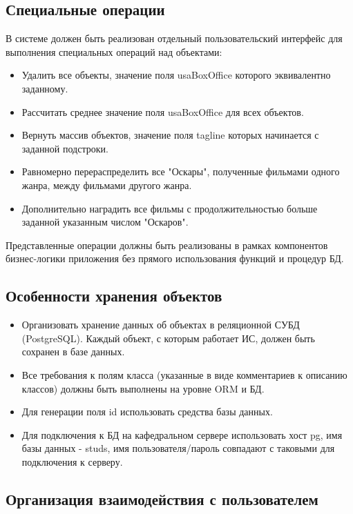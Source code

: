 \subsection{Специальные операции}

В системе должен быть реализован отдельный пользовательский интерфейс для выполнения специальных операций над объектами:

\begin{itemize}
\item Удалить все объекты, значение поля usaBoxOffice которого эквивалентно заданному.
\item Рассчитать среднее значение поля usaBoxOffice для всех объектов.
\item Вернуть массив объектов, значение поля tagline которых начинается с заданной подстроки.
\item Равномерно перераспределить все "Оскары", полученные фильмами одного жанра, между фильмами другого жанра.
\item Дополнительно наградить все фильмы с продолжительностью больше заданной указанным числом "Оскаров".
\end{itemize}

Представленные операции должны быть реализованы в рамках компонентов бизнес-логики приложения без прямого использования функций и процедур БД.

\subsection{Особенности хранения объектов}

\begin{itemize}
\item Организовать хранение данных об объектах в реляционной СУБД (PostgreSQL). Каждый объект, с которым работает ИС, должен быть сохранен в базе данных.
\item Все требования к полям класса (указанные в виде комментариев к описанию классов) должны быть выполнены на уровне ORM и БД.
\item Для генерации поля id использовать средства базы данных.
\item Для подключения к БД на кафедральном сервере использовать хост pg, имя базы данных - studs, имя пользователя/пароль совпадают с таковыми для подключения к серверу.
\end{itemize}

\subsection{Организация взаимодействия с пользователем}

